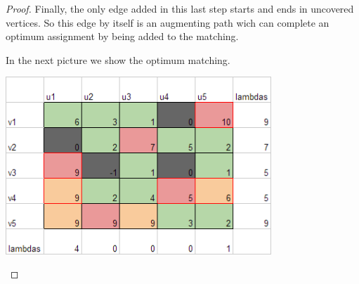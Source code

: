 \begin{proof}
    Finally, the only edge added in this last step starts and ends in uncovered
    vertices. So this edge by itself is an augmenting path wich can complete
    an optimum assignment by being added to the matching.\pn
    
    In the next picture we show the optimum matching.\pn

    \begin{center}
        \includegraphics[width=10cm]{Homework2/OptimumAssignment5.png}
    \end{center}
\end{proof}